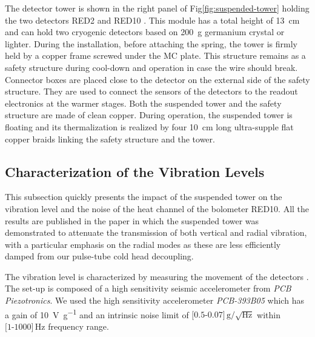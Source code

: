 The detector tower is shown in the right panel of Fig\ref{fig:suspended-tower} holding the two detectors RED2 and RED10 . This module has a total height of \SI{13}{\cm} and can hold two cryogenic detectors based on \SI{200}{\g} germanium crystal or lighter. During the installation, before attaching the spring, the tower is firmly held by a copper frame screwed under the MC plate. This structure remains as a safety structure during cool-down and operation in case the wire should break. Connector boxes are placed close to the detector on the external side of the safety structure. They are used to connect the sensors of the detectors to the readout electronics at the warmer stages. Both the suspended tower and the safety structure are made of clean  copper. During operation, the suspended tower is floating and its thermalization is realized by four \SI{10}{\cm} long ultra-supple flat copper braids linking the safety structure and the tower.


\subsection{Characterization of the Vibration Levels}

This subsection quickly presents the impact of the suspended tower on the vibration level and the noise of the heat channel of the bolometer RED10. All the results are published in the paper \cite{Maisonobe:2018tbq} in which the suspended tower was demonstrated to attenuate the transmission of both vertical and radial vibration, with a particular emphasis on the radial modes as these are less efficiently damped from our pulse-tube cold head decoupling. 

The vibration level is characterized by measuring the movement of the detectors \cite{Olivieri:2017lqz}.
The set-up is composed of a high sensitivity seismic accelerometer from \emph{PCB Piezotronics}. We used the high sensitivity accelerometer \emph{PCB-393B05} which has a gain of \SI{10}{\volt\per g} and an intrinsic noise limit of $\textrm{[0.5-0.07]}\,\textrm{g}/\sqrt{\textrm{Hz}}$ within $\textrm{[1-1000]}\,\si{\Hz}$ frequency range.

